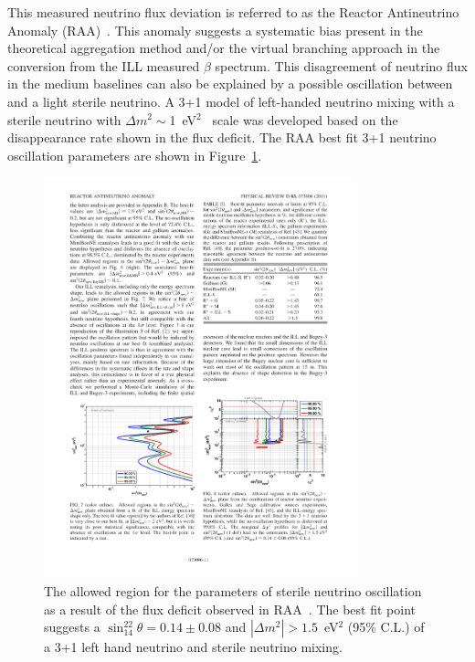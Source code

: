     This measured neutrino flux deviation is referred to as the Reactor Antineutrino Anomaly (RAA)~\cite{bib:RAA}.
    This anomaly suggests a systematic bias present in the theoretical aggregation method and/or the virtual branching approach in the conversion from the ILL measured $\beta$ spectrum.
    This disagreement of neutrino flux in the medium baselines can also be explained by a possible oscillation between \nuebar and a light sterile neutrino.
    A 3+1 model of left-handed neutrino mixing with a sterile neutrino with $\Delta m^2\sim$1~eV$^2$~\cite{bib:RAA, bib:whitepaper} scale was developed based on the disappearance rate shown in the flux deficit.
    The RAA best fit 3+1 neutrino oscillation parameters are shown in Figure~\ref{fig:RAA}.
\begin{figure}[h!]
    \centering
    \includegraphics[width=0.8\textwidth]{Figures/RAA3plus1.pdf}
    \caption[The allowed region for the parameters of sterile oscillation]{The allowed region for the parameters of sterile neutrino oscillation as a result of the flux deficit observed in RAA~\cite{bib:RAA}. The best fit point suggests a $\sin_{14}^22\theta = 0.14\pm0.08$ and $|\Delta m^2| > 1.5$~eV$^2$ (95\% C.L.) of a 3+1 left hand neutrino and sterile neutrino mixing.}
    \label{fig:RAA}
\end{figure}

